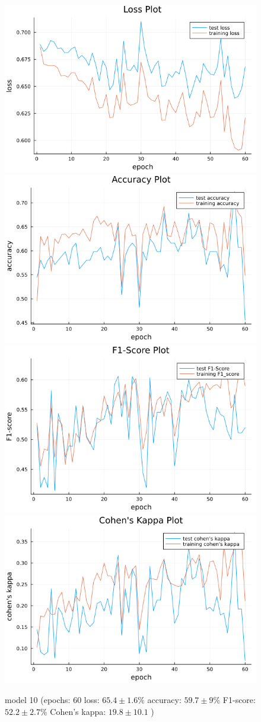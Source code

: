 \documentclass[
a4paper, 
12pt,
grayscalebody, %
abstract=on,
twoside, BCOR10mm, 12pt, DIV13,headinclude, footexclude, final, abstracton, openright
]{ibireprt}
\numberwithin{equation}{chapter}
\numberwithin{table}{chapter}
\numberwithin{figure}{chapter}
\numberwithin{algorithm}{chapter}
\numberwithin{example}{chapter}
\numberwithin{example}{chapter}
\begin{document}
\begin{figure}[h]
	\includegraphics[width=0.4\linewidth]{loss_png_final_3_2.png}\hfill
	\includegraphics[width=0.4\linewidth]{accuracy_png_final_3_2.png}
	\\[\smallskipamount]
	\includegraphics[width=0.4\linewidth]{f1_score_png_final_3_2.png}\hfill
	\includegraphics[width=0.4\linewidth]{cohens_kappa_png_final_3_2.png}
	\caption{model 10 (epochs: 60 loss: $65.4\pm1.6\% $ accuracy: $59.7\pm9\%$ F1-score: $52.2\pm2.7\%$  Cohen's kappa: $19.8\pm10.1$ )}
\end{figure}
\end{document}
